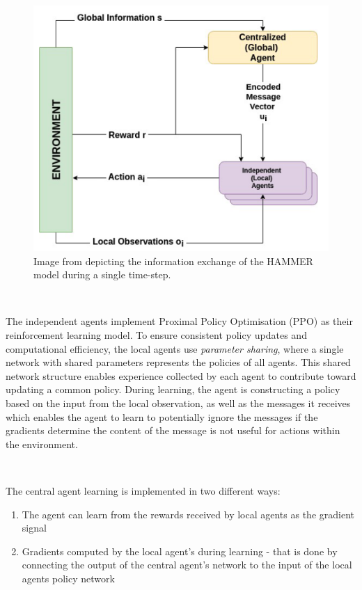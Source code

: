 \documentclass{article}
\begin{document}
\begin{figure}
	\centering
	\includegraphics[scale=0.5]{images/hammer}
	\caption{Image from \citet{gupta2022HAMMER} depicting the information exchange of the HAMMER model during a single time-step.}
	\label{fig:hammer}
\end{figure}

\

The independent agents implement Proximal Policy Optimisation (PPO) \citep{schulman2017proximal} as their reinforcement learning model. To ensure consistent policy updates and computational efficiency, the local agents use \textit{parameter sharing}, where a single network with shared parameters represents the policies of all agents. This shared network structure enables experience collected by each agent to contribute toward updating a common policy. During learning, the agent is constructing a policy based on the input from the local observation, as well as the messages it receives which enables the agent to learn to potentially ignore the messages if the gradients determine the content of the message is not useful for actions within the environment. 

\

The central agent learning is implemented in two different ways:
\begin{enumerate}
    \item The agent can learn from the rewards received by local agents as the gradient signal
    \item Gradients computed by the local agent's during learning - that is done by connecting the output of the central agent's network to the input of the local agents policy network
\end{enumerate}
\end{document}
